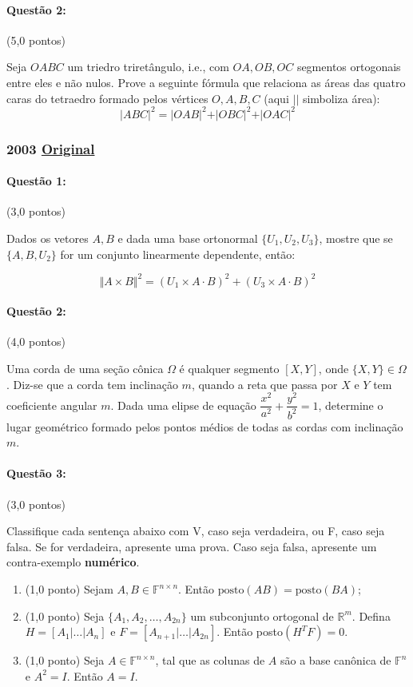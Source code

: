 \documentclass[12pt,a4paper]{article}
\newcommand{\modu}[1]{\vert #1 \vert}
\newcommand{\norm}[1]{\Vert #1 \Vert}
\newcommand{\original}[1]{\tiny \href{#1}{Original} \normalsize}
\begin{document}
\paragraph{Questão 2:} (5,0 pontos)

Seja $OABC$ um triedro triretângulo, i.e., com $OA,OB,OC$ segmentos ortogonais entre eles e não nulos. Prove a seguinte fórmula que relaciona as áreas das quatro caras do tetraedro formado pelos vértices $O,A,B,C$ (aqui $\modu{}$ simboliza área):
$$ \modu{ABC}^2 = \modu{OAB}^2 + \modu{OBC}^2+\modu{OAC}^2  $$

\newpage
\subsubsection{2003 \original{https://drive.google.com/file/d/1kw8OtWkoGKkbaNkq593NvCbfYwr6HLoR/view?usp=sharing}}

\paragraph{Questão 1:} (3,0 pontos)

Dados os vetores $A,B$ e dada uma base ortonormal $\{U_1,U_2,U_3\}$, mostre que se $\{A,B,U_2\}$ for um conjunto linearmente dependente, então:

$$\norm{A\times B}^2 = (U_1\times A \cdot B)^2 + (U_3 \times A \cdot B)^2 $$

\paragraph{Questão 2:} (4,0 pontos)

Uma corda de uma seção cônica $\Omega$ é qualquer segmento $[X,Y]$, onde $\{X,Y\} \in \Omega$. Diz-se que a corda tem inclinação $m$, quando a reta que passa por $X$ e $Y$ tem coeficiente angular $m$. Dada uma elipse de equação $\dfrac{x^2}{a^2}+\dfrac{y^2}{b^2}=1$, determine o lugar geométrico formado pelos pontos médios de todas as cordas com inclinação $m$. 

\paragraph{Questão 3:} (3,0 pontos)

Classifique cada sentença abaixo com V, caso seja verdadeira, ou F, caso seja falsa. Se for verdadeira, apresente uma prova. Caso seja falsa, apresente um contra-exemplo \textbf{numérico}.

\begin{enumerate}[label=(\alph*)]
\item (1,0 ponto)  Sejam $A,B \in \mathbb{F}^{n\times n}$. Então $\textrm{posto}(AB)=\textrm{posto}(BA)$;
\item (1,0 ponto) Seja $\{A_1,A_2,\dots,A_{2n}\}$ um subconjunto ortogonal de $\mathbb{R}^m$. Defina $H=[A_1|\dots|A_n]$ e $F=[A_{n+1}|\dots|A_{2n}]$. Então posto$(H^TF)=0$.
\item (1,0 ponto) Seja $A\in \mathbb{F}^{n\times n}$, tal que as colunas de $A$ são a base canônica de $\mathbb{F}^{n}$ e $A^2=I$. Então $A=I$.
\end{enumerate}
\end{document}
